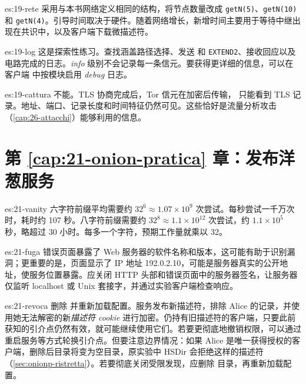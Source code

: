 \begin{soluzione}{es:19-rete}
采用与本书网络定义相同的结构，将节点数量改成 \texttt{getN(5)}、\texttt{getN(10)} 和 \texttt{getN(4)}。引导时间取决于硬件。随着网络增长，新增时间主要用于等待中继出现在共识中，以及客户端下载微描述符。
\end{soluzione}

\begin{soluzione}{es:19-log}
这是探索性练习。查找涵盖路径选择、发送  和 \texttt{EXTEND2}、接收回应以及电路完成的日志。\emph{info} 级别不会记录每一条信元。要获得更详细的信息，可以在客户端  中按模块启用 \emph{debug} 日志。
\end{soluzione}

\begin{soluzione}{es:19-cattura}
不能。TLS 协商完成后，Tor 信元在加密后传输， 只能看到 TLS 记录。地址、端口、记录长度和时间特征仍然可见。这些恰好是流量分析攻击（\cref{cap:26-attacchi}）能够利用的信息。
\end{soluzione}

\section*{第 \ref{cap:21-onion-pratica} 章：发布洋葱服务}

\begin{soluzione}{es:21-vanity}
六字符前缀平均需要约 $32^6\approx1.07\times10^9$ 次尝试。每秒尝试一千万次时，耗时约 107 秒。八字符前缀需要约 $32^8\approx1.1\times10^{12}$ 次尝试，约 $1.1\times10^5$ 秒，略超过 30 小时。每多一个字符，预期工作量就乘以 32。
\end{soluzione}

\begin{soluzione}{es:21-fuga}
错误页面暴露了 Web 服务器的软件名称和版本，这可能有助于识别漏洞；更重要的是，页面显示了 IP 地址 192.0.2.10，可能是服务器真实的公开地址，使服务位置暴露。应关闭 HTTP 头部和错误页面中的服务器签名，让服务器仅监听 localhost 或 Unix 套接字，并通过实验客户端检查响应。
\end{soluzione}

\begin{soluzione}{es:21-revoca}
删除  并重新加载配置。服务发布新描述符，排除 Alice 的记录，并使用她无法解密的新\emph{描述符 cookie} 进行加密。仍持有旧描述符的客户端，只要此前获知的引介点仍然有效，就可能继续使用它们。若要更彻底地撤销权限，可以通过重启服务等方式轮换引介点。但要注意边界情况：如果 Alice 是唯一获得授权的客户端，删除后目录将变为空目录，原实验中 HSDir 会拒绝这样的描述符（\cref{sec:onionp-ristretta}）。若要彻底关闭受限发现，应删除  目录，再重新加载配置。
\end{soluzione}

